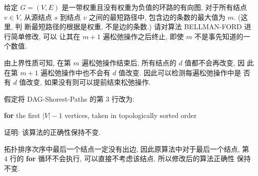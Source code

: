 \documentclass[boxes]{homework}
\begin{document}
\begin{problem}
给定 $G=(V, E)$ 是一带权重且没有权重为负值的环路的有向图, 对于所有结点 $v\in V$,
从源结点 $s$ 到结点 $v$ 之间的最短路径中, 包含边的条数的最大值为 $m$. (这里, 判
断最短路径的根据是权重, 不是边的条数.) 请对算法 BELLMAN-FORD 进行简单修改, 可以
让其在 $m + 1$ 遍松弛操作之后终止, 即使 $m$ 不是事先知道的一个数值.
\end{problem}
\begin{solution}
    由上界性质可知, 在第 $m$ 遍松弛操作结束后, 所有结点的 $d$ 值都不会再改变, 因
    此在第 $m + 1$ 遍松弛操作中也不会有 $d$ 值改变. 因此可以检测每遍松弛操作中是
    否有 $d$ 值改变, 如果没有则可以提前结束松弛操作.
\end{solution}

\begin{problem}
假定将 {\sc DAG-Shorest-Paths} 的第 3 行改为:

\textbf{for} the first $|V| - 1$ vertices, taken in topologically sorted
order

证明: 该算法的正确性保持不变.
\end{problem}
\begin{solution}
    拓扑排序次序中最后一个结点一定没有出边, 因此原算法中对于最后一个结点, 第 4
    行的 \textbf{for} 循环不会执行, 可以直接不考虑该结点. 所以修改后的算法正确性
    保持不变.
\end{solution}
\end{document}
